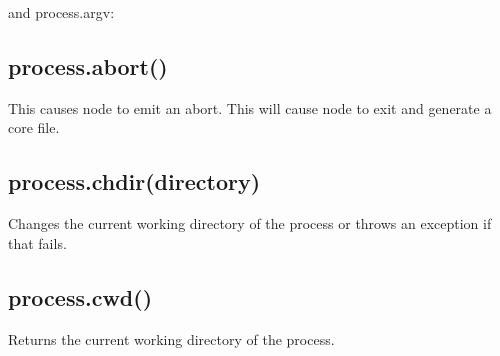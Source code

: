 and process.argv:

\begin{Shaded}
\begin{Highlighting}[]
\NormalTok{[}\NormalTok{, }\NormalTok{, }\NormalTok{]}
\end{Highlighting}
\end{Shaded}

\subsection{process.abort()}\label{process.abort}

This causes node to emit an abort. This will cause node to exit and
generate a core file.

\subsection{process.chdir(directory)}\label{process.chdirdirectory}

Changes the current working directory of the process or throws an
exception if that fails.

\begin{Shaded}
\begin{Highlighting}[]
\NormalTok{(} \NormalTok{+ }\NormalTok{());}
 \NormalTok{\{}
  \NormalTok{(}\NormalTok{);}
  \NormalTok{(} \NormalTok{+ }\NormalTok{());}
\NormalTok{\}}
 
  \NormalTok{(} 
\NormalTok{\}}
\end{Highlighting}
\end{Shaded}

\subsection{process.cwd()}\label{process.cwd}

Returns the current working directory of the process.

\begin{Shaded}
\begin{Highlighting}[]
\NormalTok{(} \NormalTok{+ }\NormalTok{());}
\end{Highlighting}
\end{Shaded}

